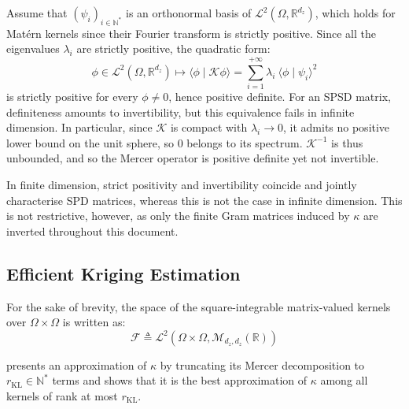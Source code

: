 \begin{remark}
	Assume that $(\psi_i)_{i\in\mathbb{N}^*}$ is an orthonormal basis of $\mathcal{L}^2(\Omega,\mathbb{R}^{d_z})$, which holds for Matérn kernels since their Fourier transform is strictly positive. Since all the eigenvalues $\lambda_i$ are strictly positive, the quadratic form:
	\begin{equation}
		\phi\in\mathcal{L}^2(\Omega,\mathbb{R}^{d_z})\mapsto\langle\phi\mid\mathcal{K}\phi\rangle=\sum_{i=1}^{+\infty}\lambda_i\:\langle\phi\mid\psi_i\rangle^2
	\end{equation}
	is strictly positive for every $\phi\neq0$, hence positive definite. For an SPSD matrix, definiteness amounts to invertibility, but this equivalence fails in infinite dimension. In particular, since $\mathcal{K}$ is compact with $\lambda_i\to0$, it admits no positive lower bound on the unit sphere, so $0$ belongs to its spectrum. $\mathcal{K}^{-1}$ is thus unbounded, and so the Mercer operator is positive definite yet not invertible.

	In finite dimension, strict positivity and invertibility coincide and jointly characterise SPD matrices, whereas this is not the case in infinite dimension. This is not restrictive, however, as only the finite Gram matrices induced by $\kappa$ are inverted throughout this document.
\end{remark}

\subsection{Efficient Kriging Estimation}\label{sec:efficient_kriging}

For the sake of brevity, the space of the square-integrable matrix-valued kernels over $\Omega\times\Omega$ is written as:
\begin{equation}
	\mathcal{F}\triangleq\mathcal{L}^2\left(\Omega\times\Omega,\mathcal{M}_{d_z,d_z}(\mathbb{R})\right)
\end{equation}

 presents an approximation of $\kappa$ by truncating its Mercer decomposition to $r_{\mathrm{KL}}\in\mathbb{N}^*$ terms and shows that it is the best approximation of $\kappa$ among all kernels of rank at most $r_{\mathrm{KL}}$.

